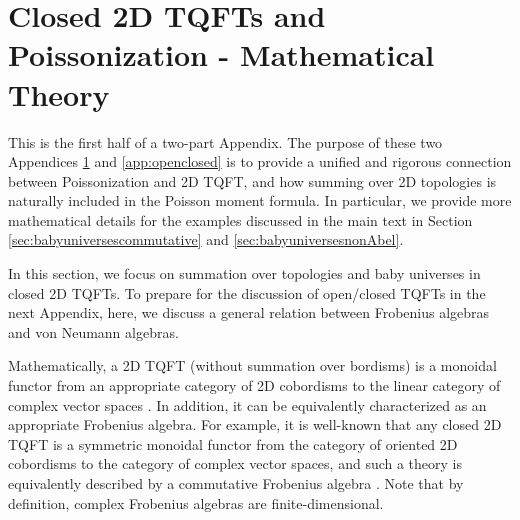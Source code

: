 \documentclass[a4paper,11pt]{article}
\theoremstyle{definition}
\numberwithin{equation}{section}
\begin{document}


\section{Closed 2D TQFTs and Poissonization - Mathematical Theory}\label{app:closed}

This is the first half of a two-part Appendix. The purpose of these two Appendices \ref{app:closed} and \ref{app:openclosed} is to provide a unified and rigorous connection between Poissonization and 2D TQFT, and how summing over 2D topologies is naturally included in the Poisson moment formula. In particular, we provide more mathematical details for the examples discussed in the main text in Section \ref{sec:babyuniversescommutative} and \ref{sec:babyuniversesnonAbel}.

In this section, we focus on summation over topologies and baby universes in closed 2D TQFTs. To prepare for the discussion of open/closed TQFTs in the next Appendix, here, we discuss a general relation between Frobenius algebras and von Neumann algebras.

Mathematically, a 2D TQFT (without summation over bordisms) is a monoidal functor from an appropriate category of 2D cobordisms to the linear category of complex vector spaces \cite{tqftreview, @Moore-Segal, abrams1996two, frobeniusTQFT2, frobeniusTQFT3}. In addition, it can be equivalently characterized as an appropriate Frobenius algebra. For example, it is well-known that any closed 2D TQFT is a symmetric monoidal functor from the category of oriented 2D cobordisms to the category of complex vector spaces, and such a theory is equivalently described by a commutative Frobenius algebra \cite{frobeniusTQFT2}. Note that by definition, complex Frobenius algebras are finite-dimensional. 
\end{document}
